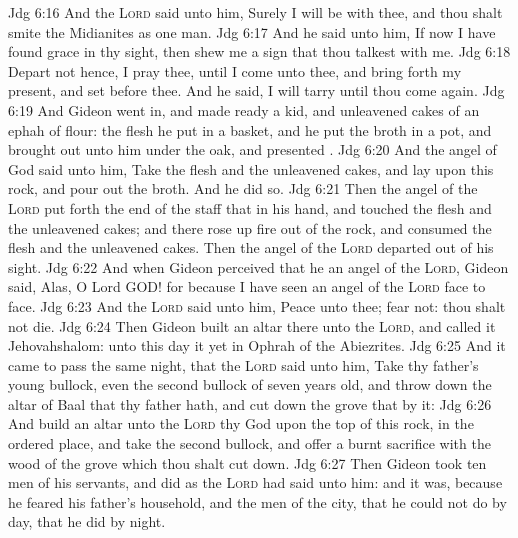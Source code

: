 \vs Jdg 6:16 And the \textsc{Lord} said unto him, Surely I will be with thee, and thou shalt smite the Midianites as one man.
\vs Jdg 6:17 And he said unto him, If now I have found grace in thy sight, then shew me a sign that thou talkest with me.
\vs Jdg 6:18 Depart not hence, I pray thee, until I come unto thee, and bring forth my present, and set  before thee. And he said, I will tarry until thou come again.
\vs Jdg 6:19 And Gideon went in, and made ready a kid, and unleavened cakes of an ephah of flour: the flesh he put in a basket, and he put the broth in a pot, and brought  out unto him under the oak, and presented .
\vs Jdg 6:20 And the angel of God said unto him, Take the flesh and the unleavened cakes, and lay  upon this rock, and pour out the broth. And he did so.
\vs Jdg 6:21 Then the angel of the \textsc{Lord} put forth the end of the staff that  in his hand, and touched the flesh and the unleavened cakes; and there rose up fire out of the rock, and consumed the flesh and the unleavened cakes. Then the angel of the \textsc{Lord} departed out of his sight.
\vs Jdg 6:22 And when Gideon perceived that he  an angel of the \textsc{Lord}, Gideon said, Alas, O Lord GOD! for because I have seen an angel of the \textsc{Lord} face to face.
\vs Jdg 6:23 And the \textsc{Lord} said unto him, Peace  unto thee; fear not: thou shalt not die.
\vs Jdg 6:24 Then Gideon built an altar there unto the \textsc{Lord}, and called it Jehovahshalom: unto this day it  yet in Ophrah of the Abiezrites.
\vs Jdg 6:25 And it came to pass the same night, that the \textsc{Lord} said unto him, Take thy father's young bullock, even the second bullock of seven years old, and throw down the altar of Baal that thy father hath, and cut down the grove that  by it:
\vs Jdg 6:26 And build an altar unto the \textsc{Lord} thy God upon the top of this rock, in the ordered place, and take the second bullock, and offer a burnt sacrifice with the wood of the grove which thou shalt cut down.
\vs Jdg 6:27 Then Gideon took ten men of his servants, and did as the \textsc{Lord} had said unto him: and  it was, because he feared his father's household, and the men of the city, that he could not do  by day, that he did  by night.
